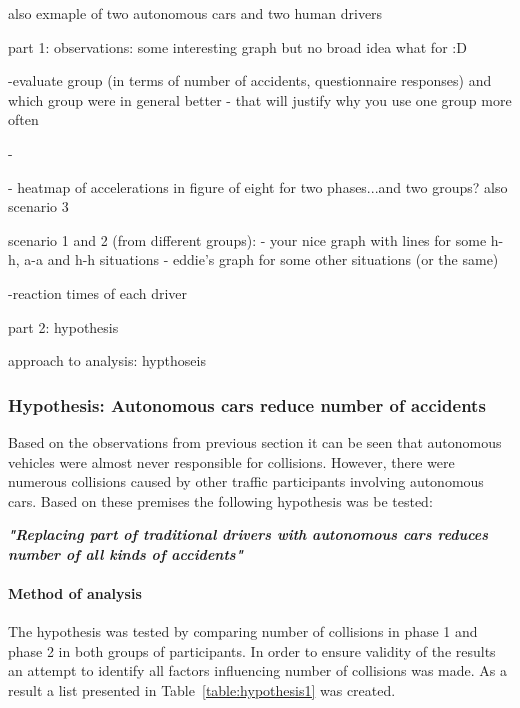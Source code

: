 \documentclass[11pt,english]{article}
\begin{document}


also exmaple of two autonomous cars and two human drivers



part 1: observations:
some interesting graph but no broad idea what for :D

-evaluate group (in terms of number of accidents, questionnaire responses) and which group were in general better - that will justify why you use one group more often

- 

- heatmap of accelerations in figure of eight for two phases...and two groups?
also scenario 3




scenario 1 and 2 (from different groups):
- your nice graph with lines for some h-h, a-a and h-h situations
- eddie's graph for some other situations (or the same)


-reaction times of each driver




part 2: hypothesis

approach to analysis: hypthoseis


\subsubsection{Hypothesis: Autonomous cars reduce number of accidents}


Based on the observations from previous section it can be seen that autonomous vehicles were almost never responsible for collisions. However, there were numerous collisions caused by other traffic participants involving autonomous cars. Based on these premises the following hypothesis was be tested:

\textbf{\textit{"Replacing part of traditional drivers with autonomous cars reduces number of all kinds of accidents"}}

\paragraph{Method of analysis}

The hypothesis was tested by comparing number of collisions in phase 1 and phase 2 in both groups of participants. In order to ensure validity of the results an attempt to identify all factors influencing number of collisions was made. As a result a list presented in Table~\ref{table:hypothesis1} was created.
\end{document}
